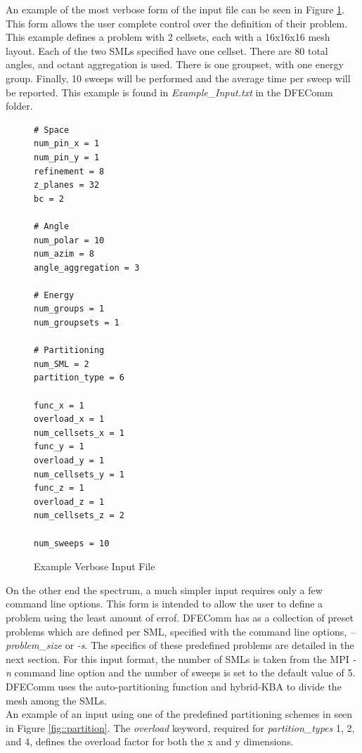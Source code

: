 \documentclass{article}
\begin{document}
An example of the most verbose form of the input file can be seen in Figure \ref{fig::verbose}. This form allows the user complete control over the definition of their problem. This example defines a problem with 2 cellsets, each with a 16x16x16 mesh layout. Each of the two SMLs specified have one cellset. There are 80 total angles, and octant aggregation is used. There is one groupset, with one energy group. Finally, 10 sweeps will be performed and the average time per sweep will be reported. This example is found in \emph{Example\_Input.txt} in the DFEComm folder.\\
\begin{figure}[H]
\begin{verbatim}
# Space
num_pin_x = 1
num_pin_y = 1
refinement = 8
z_planes = 32
bc = 2

# Angle
num_polar = 10
num_azim = 8
angle_aggregation = 3

# Energy
num_groups = 1
num_groupsets = 1
  	
# Partitioning
num_SML = 2
partition_type = 6
  	
func_x = 1
overload_x = 1
num_cellsets_x = 1
func_y = 1
overload_y = 1
num_cellsets_y = 1
func_z = 1
overload_z = 1
num_cellsets_z = 2

num_sweeps = 10
\end{verbatim}
  \caption[]{Example Verbose Input File}\label{fig::verbose}
\end{figure}

On the other end the spectrum, a much simpler input requires only a few command line options. This form is intended to allow the user to define a problem using the least amount of errof. DFEComm has as a collection of preset problems which are defined per SML, specified with the command line options, \emph{--problem\_size} or \emph{-s}. The specifics of these predefined problems are detailed in the next section. For this input format, the number of SMLs is taken from the MPI \emph{-n} command line option and the number of sweeps is set to the default value of 5. DFEComm uses the auto-partitioning function and hybrid-KBA to divide the mesh among the SMLs. \\

An example of an input using one of the predefined partitioning schemes in seen in Figure \ref{fig::partition}. The \emph{overload} keyword, required for \emph{partition\_types} 1, 2, and 4, defines the overload factor for both the x and y dimensions. \\
\end{document}
